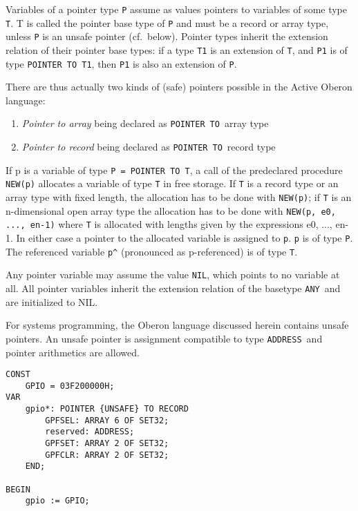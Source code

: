 \documentclass[a4wide,11pt]{article}
\newcommand{\POINTER}{\lstinline"POINTER"}
\newcommand{\TO}{\lstinline"TO"}
\newcommand{\NIL}{\lstinline"NIL"}
\newcommand{\ANY}{\lstinline"ANY"}
\newcommand{\ADDRESS}{\lstinline"ADDRESS"}
\begin{document}
Variables of a pointer type \lstinline"P" assume as values pointers to variables of some type \lstinline"T".
T is called the pointer base type of \lstinline"P" and must be a record or array type, unless \lstinline"P" is an unsafe pointer (cf.\ below).
Pointer types inherit the extension relation of their pointer base types: if a type \lstinline"T1" is an extension of \lstinline"T", and \lstinline"P1" is of type \lstinline"POINTER TO T1", then \lstinline"P1" is also an extension of \lstinline"P".


There are thus actually two kinds of (safe) pointers possible in the Active Oberon language:
\begin{enumerate}
\renewcommand{\labelenumi}{(\alph{enumi})}
\item \emph{Pointer to array} being declared as \POINTER\ \TO\ array type
\item \emph{Pointer to record} being declared as \POINTER\ \TO\ record type
\end{enumerate}

If p is a variable of type \lstinline"P = POINTER TO T", a call of the predeclared procedure \lstinline"NEW(p)" allocates a variable of type \lstinline"T" in free storage.
If \lstinline"T" is a record type or an array type with fixed length, the allocation has to be done with \lstinline"NEW(p)";
if \lstinline"T" is an n-dimensional open array type the allocation has to be done with \lstinline"NEW(p, e0, ..., en-1)" where \lstinline"T" is allocated with lengths given by the expressions e0, ..., en-1.
In either case a pointer to the allocated variable is assigned to \lstinline"p". \lstinline"p" is of type \lstinline"P".
The referenced  variable \verb"p^" (pronounced as p-referenced) is of type \lstinline"T".

Any pointer variable may assume the value \NIL, which points to no variable at all.
All pointer variables inherit the extension relation of the basetype \ANY\ and are initialized to NIL.

For systems programming, the Oberon language discussed herein contains unsafe pointers.
An unsafe pointer is assignment compatible to type \ADDRESS\ and pointer arithmetics are allowed.

\begin{lstlisting}[style=example]
CONST
	GPIO = 03F200000H;
VAR
	gpio*: POINTER {UNSAFE} TO RECORD
		GPFSEL: ARRAY 6 OF SET32;
		reserved: ADDRESS;
		GPFSET: ARRAY 2 OF SET32;
		GPFCLR: ARRAY 2 OF SET32;
	END;

BEGIN
	gpio := GPIO;
\end{lstlisting}
\end{document}
